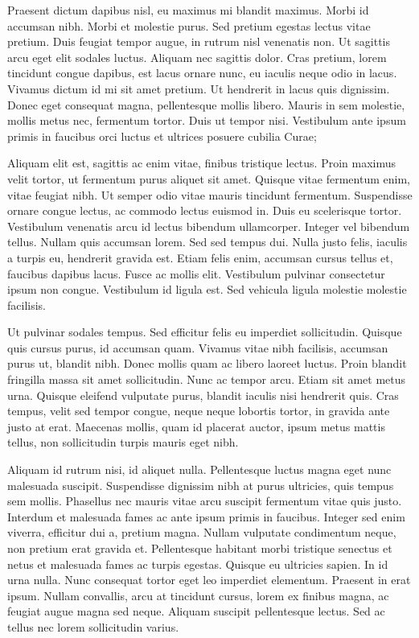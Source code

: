 
Praesent dictum dapibus nisl, eu maximus mi blandit maximus. Morbi id accumsan nibh. Morbi et molestie purus. Sed pretium egestas lectus vitae pretium. Duis feugiat tempor augue, in rutrum nisl venenatis non. Ut sagittis arcu eget elit sodales luctus. Aliquam nec sagittis dolor. Cras pretium, lorem tincidunt congue dapibus, est lacus ornare nunc, eu iaculis neque odio in lacus. Vivamus dictum id mi sit amet pretium. Ut hendrerit in lacus quis dignissim. Donec eget consequat magna, pellentesque mollis libero. Mauris in sem molestie, mollis metus nec, fermentum tortor. Duis ut tempor nisi. Vestibulum ante ipsum primis in faucibus orci luctus et ultrices posuere cubilia Curae;
\smallskip

Aliquam elit est, sagittis ac enim vitae, finibus tristique lectus. Proin maximus velit tortor, ut fermentum purus aliquet sit amet. Quisque vitae fermentum enim, vitae feugiat nibh. Ut semper odio vitae mauris tincidunt fermentum. Suspendisse ornare congue lectus, ac commodo lectus euismod in. Duis eu scelerisque tortor. Vestibulum venenatis arcu id lectus bibendum ullamcorper. Integer vel bibendum tellus. Nullam quis accumsan lorem. Sed sed tempus dui. Nulla justo felis, iaculis a turpis eu, hendrerit gravida est. Etiam felis enim, accumsan cursus tellus et, faucibus dapibus lacus. Fusce ac mollis elit. Vestibulum pulvinar consectetur ipsum non congue. Vestibulum id ligula est. Sed vehicula ligula molestie molestie facilisis.
\smallskip

Ut pulvinar sodales tempus. Sed efficitur felis eu imperdiet sollicitudin. Quisque quis cursus purus, id accumsan quam. Vivamus vitae nibh facilisis, accumsan purus ut, blandit nibh. Donec mollis quam ac libero laoreet luctus. Proin blandit fringilla massa sit amet sollicitudin. Nunc ac tempor arcu. Etiam sit amet metus urna. Quisque eleifend vulputate purus, blandit iaculis nisi hendrerit quis. Cras tempus, velit sed tempor congue, neque neque lobortis tortor, in gravida ante justo at erat. Maecenas mollis, quam id placerat auctor, ipsum metus mattis tellus, non sollicitudin turpis mauris eget nibh.
\smallskip

Aliquam id rutrum nisi, id aliquet nulla. Pellentesque luctus magna eget nunc malesuada suscipit. Suspendisse dignissim nibh at purus ultricies, quis tempus sem mollis. Phasellus nec mauris vitae arcu suscipit fermentum vitae quis justo. Interdum et malesuada fames ac ante ipsum primis in faucibus. Integer sed enim viverra, efficitur dui a, pretium magna. Nullam vulputate condimentum neque, non pretium erat gravida et. Pellentesque habitant morbi tristique senectus et netus et malesuada fames ac turpis egestas. Quisque eu ultricies sapien. In id urna nulla. Nunc consequat tortor eget leo imperdiet elementum. Praesent in erat ipsum. Nullam convallis, arcu at tincidunt cursus, lorem ex finibus magna, ac feugiat augue magna sed neque. Aliquam suscipit pellentesque lectus. Sed ac tellus nec lorem sollicitudin varius. 
\smallskip





